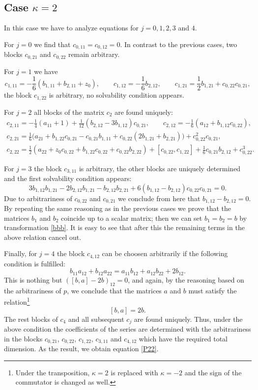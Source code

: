 \documentclass{article}
\theoremstyle{plain}
\theoremstyle{definition}
\begin{document}
\subsection{Case $\kappa = 2$}

In this case we have to analyze equations for $j=0,1,2,3$ and $4$. 

For $j=0$ we find that $c_{0,11}=c_{0,12}=0$. In contrast to the previous cases, two blocks $c_{0,21}$ and $c_{0,22}$ remain arbitrary. 

For $j=1$ we have
\[
 c_{1,11}=-\frac{1}{6}(b_{1,11}+b_{2,11}+z_0),\qquad 
 c_{1,12}=-\frac{1}{6}b_{2,12},\qquad
 c_{1,21}=\frac{1}{2}b_{1,21}+c_{0,22}c_{0,21},
\]
the block $c_{1,22}$ is arbitrary, no solvability condition appears.

For $j=2$ all blocks of the matrix $c_2$ are found uniquely:
\begin{gather*}
 c_{2,11}=-\frac{1}{4}(a_{11}+1)+\frac{1}{12}(b_{2,12}-3b_{1,12})c_{0,21},\qquad
 c_{2,12}=-\frac{1}{6}(a_{12}+b_{1,12}c_{0,22}),\\
 c_{2,21}=\frac{1}{6}\big(a_{21}+b_{1,22}c_{0,21}-c_{0,21}b_{1,11}+c_{0,22}(2b_{1,21}+b_{2,21})\big)
    +c^2_{0,22}c_{0,21},\\
 c_{2,22}=\frac{1}{2}(a_{22}+z_0c_{0,22}+b_{1,22}c_{0,22}+c_{0,22}b_{2,22})
  +[c_{0,22},c_{1,22}]+\frac{1}{6}c_{0,21}b_{2,12}+c^3_{0,22}.    
\end{gather*}

For $j=3$ the block $c_{3,11}$ is arbitrary, the other blocks are uniquely determined and the first solvability condition appears:
\[
 3b_{1,12}b_{1,21}-2b_{2,12}b_{1,21}-b_{2,12}b_{2,21}
  +6(b_{1,12}-b_{2,12})c_{0,22}c_{0,21}=0.
\]
Due to arbitrariness of $c_{0,22}$ and $c_{0,21}$ we conclude from here that $b_{1,12}-b_{2,12}=0$. By repeating the same reasoning as in the previous cases we prove that the matrices $b_1$ and $b_2$ coincide up to a scalar matrix; then we can set $b_1=b_2=b$ by transformation \eqref{bbb}. It is easy to see that after this the remaining terms in the above relation cancel out.

Finally, for $j=4$ the block $c_{4,12}$ can be choosen arbitrarily if the following condition is fulfilled:
\[
 b_{11}a_{12}+b_{12}a_{22}=a_{11}b_{12}+a_{12}b_{22}+2b_{12}.
\]
This is nothing but $([b,a]-2b)_{12}=0$, and again, by the reasoning based on the arbitrariness of $p$, we conclude that the matrices $a$ and $b$ must satisfy the relation\footnote{Under the transposition, $\kappa=2$ is replaced with $\kappa=-2$ and the sign of the commutator is changed as well.}
\[
 [b,a]=2b.
\]
The rest blocks of $c_4$ and all subsequent $c_j$ are found uniquely. Thus, under the above condition the coefficients of the series are determined with the arbitrariness in the blocks $c_{0,21}$, $c_{0,22}$, $c_{1,22}$, $c_{3,11}$ and $c_{4,12}$ which have the required total dimension. As the result, we obtain equation \ref{P22}. 
\end{document}

